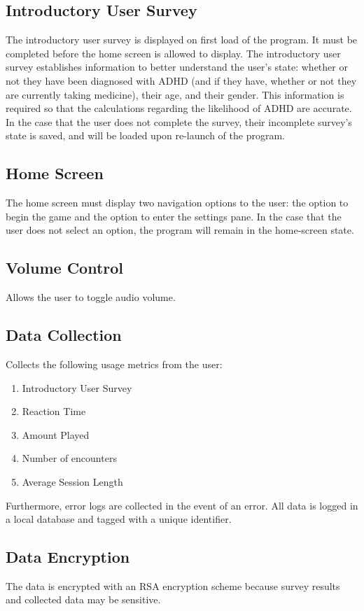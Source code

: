 \documentclass[a4wide]{article}
\begin{document}
\subsection{Introductory User Survey}
The introductory user survey is displayed on first load of the program. It must
be completed before the home screen is allowed to display. The introductory user
survey establishes information to better understand the user's state: whether or
not they have been diagnosed with ADHD (and if they have, whether or not they
are currently taking medicine), their age, and their gender. This information is
required so that the calculations regarding the likelihood of ADHD are accurate.
In the case that the user does not complete the survey, their incomplete
survey's state is saved, and will be loaded upon re-launch of the program.

\subsection{Home Screen}
The home screen must display two navigation options to the user: the option to
begin the game and the option to enter the settings pane. In the case that the
user does not select an option, the program will remain in the home-screen
state.

\subsection{Volume Control}
Allows the user to toggle audio volume.

\subsection{Data Collection}
Collects the following usage metrics from the user:
\begin{enumerate}
\item Introductory User Survey
\item Reaction Time
\item Amount Played
\item Number of encounters
\item Average Session Length
\end{enumerate}

Furthermore, error logs are collected in the event of an error. All data is
logged in a local database and tagged with a unique identifier.

\subsection{Data Encryption}
The data is encrypted with an RSA encryption scheme because survey results and
collected data may be sensitive.
\end{document}
